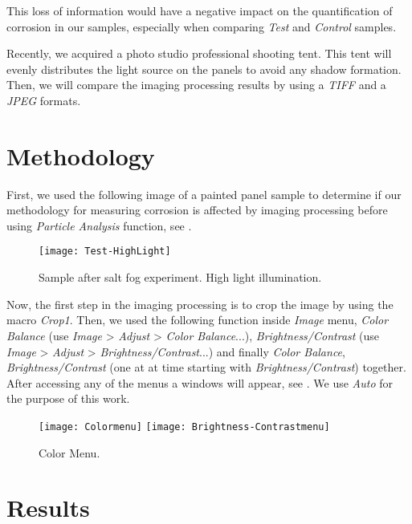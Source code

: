 \documentclass[10pt, fleqn]{article}    %
\begin{document}
		This loss of information would have a negative impact on the quantification of corrosion in our samples, especially when comparing \textit{Test} and \textit{Control} samples. 
		
		Recently, we acquired a photo studio professional shooting tent. This tent will evenly distributes the light source on the panels to avoid any shadow formation. Then, we will compare the imaging processing results by using a \textit{TIFF} and a \textit{JPEG} formats. 
				
		
	\section*{Methodology}	
	
		First, we used the following image of a painted panel sample to determine if our methodology for measuring corrosion is affected by imaging processing before using \textit{Particle Analysis} function, see . 
	
	\begin{figure}[H]
		\centering
		\texttt{[image: Test-HighLight]} 
		\caption{Sample after salt fog experiment. High light illumination.}
		\label{fig:HighQuality}
	\end{figure}


	Now, the first step in the imaging processing is to crop the image by using the macro \textit{Crop1}. Then, we used the following function inside \textit{Image} menu, \textit{Color Balance} (use \textit{Image} > \textit{Adjust} > \textit{Color Balance}...), \textit{Brightness/Contrast} (use \textit{Image} > \textit{Adjust} > \textit{Brightness/Contrast}...) and finally \textit{Color Balance}, \textit{Brightness/Contrast} (one at at time starting with \textit{Brightness/Contrast}) together.  After accessing any of the menus a windows will appear, see . We use \textit{Auto} for the purpose of this work.  
	
	\begin{figure}[H]
		\centering
		\texttt{[image: Colormenu]} 
		\texttt{[image: Brightness-Contrastmenu]} 
		\caption{Color Menu.}
		\label{fig:Colormenu}
	\end{figure}
	
	
	
	
	
	\section*{Results}
	
\end{document}
